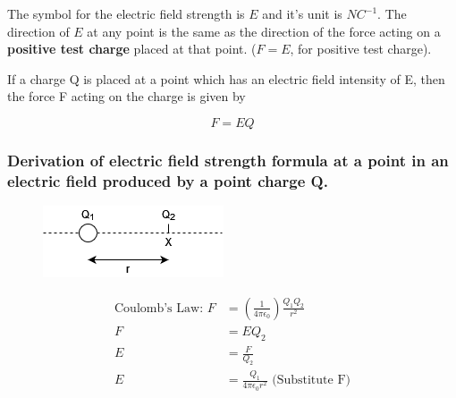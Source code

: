 \documentclass[../../../main.tex]{subfiles}
\begin{document}
The symbol for the electric field strength is \(E\) and it's unit is \(NC^{-1}\).
The direction of \(E\) at any point is the same as the direction of the force acting on a \textbf{positive test charge} placed at that point. (\(F=E\), for positive test charge).

\bigskip

If a charge Q is placed at a point which has an electric field intensity of E, then the force F acting on the charge is given by

\begin{equation}
    F=EQ
\end{equation}

\subsubsection{Derivation of electric field strength formula at a point in an electric field produced by a point charge Q.}

\begin{figure}[h]
    \includegraphics[]{figures/1.png}
    \centering
\end{figure}

\begin{align*}
    \text{Coulomb's Law: } F & =(\frac{1}{4\pi\epsilon_0})\frac{Q_1Q_2}{r^2}         \\
    F                        & =EQ_2                                                 \\
    E                        & =\frac{F}{Q_2}                                        \\
    E                        & =\frac{Q_1}{4\pi\epsilon_0r^2} \text{ (Substitute F)}
\end{align*}
\end{document}
